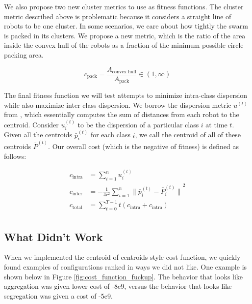 \documentclass[conference]{IEEEtran}
\begin{document}
  We also propose two new cluster metrics to use as fitness functions. The cluster metric described above is problematic because it considers a straight line of robots to be one cluster. In some scenarios, we care about how tightly the swarm is packed in its clusters. We propose a new metric, which is the ratio of the area inside the convex hull of the robots as a fraction of the minimum possible circle-packing area.

  $$ c_{\text{pack}} = \frac{A_\text{convex hull}}{A_{\text{pack}}} \in (1, \infty) $$

  The final fitness function we will test attempts to minimize intra-class dispersion while also maximize inter-class dispersion. We borrow the dispersion metric $u^{(t)}$ from \cite{gauci_self-organized_2014}, which essentially computes the sum of distances from each robot to the centroid. Consider $u_i^{(t)}$ to be the dispersion of a particular class $i$ at time $t$. Given all the centroids $\bar{p}_i^{(t)}$ for each class $i$, we call the centroid of all of these centroids $\bar{P}^{(t)}$. Our overall cost (which is the negative of fitness) is defined as follows:

  \begin{align*}
  c_{\text{intra}} &= \sum_{i=1}^n u_i^{(t)} \\
  c_{\text{inter}} &= -\frac{1} {4r^2}\sum_{i=1}^n{\lVert \bar{p}_i^{(t)} - \bar{P}_i^{(t)} \rVert}^2 \\
  c_{\text{total}} &=  \sum_{t=0}^{T-1} t (c_{\text{intra}} + c_{\text{intra}}) \\
  \end{align*}


  \subsection{What Didn't Work}
  
  When we implemented the centroid-of-centroids style cost function, we quickly found examples of configurations ranked in ways we did not like. One example is shown below in Figure \ref{fig:cost_function_fuckup}. The behavior that looks like aggregation was given lower cost of -8e9, versus the behavior that looks like segregation was given a cost of -5e9.
  
\end{document}
